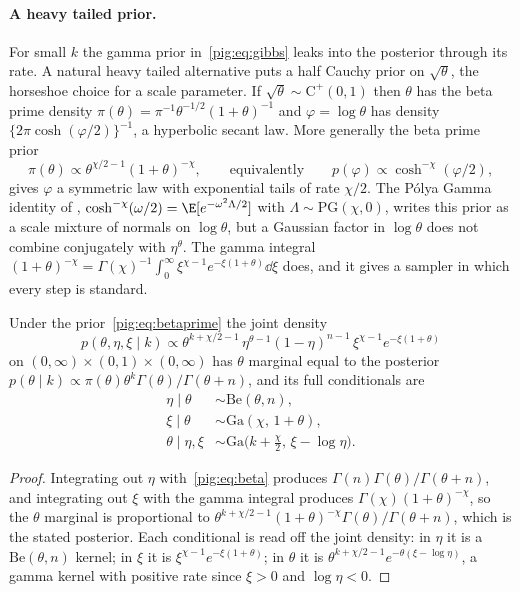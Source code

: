 \paragraph{A heavy tailed prior.} For small $k$ the gamma prior in~\eqref{pig:eq:gibbs} leaks into the posterior through its rate. A natural heavy tailed alternative puts a half Cauchy prior on $\sqrt\theta$, the horseshoe choice for a scale parameter. If $\sqrt\theta\sim\mathrm{C}^+(0,1)$ then $\theta$ has the beta prime density $\pi(\theta)=\pi^{-1}\theta^{-1/2}(1+\theta)^{-1}$ and $\varphi=\log\theta$ has density $\{2\pi\cosh(\varphi/2)\}^{-1}$, a hyperbolic secant law. More generally the beta prime prior
\begin{equation}\label{pig:eq:betaprime}
\pi(\theta)\propto\theta^{\chi/2-1}(1+\theta)^{-\chi},\qquad\text{equivalently}\qquad p(\varphi)\propto\cosh^{-\chi}(\varphi/2),
\end{equation}
gives $\varphi$ a symmetric law with exponential tails of rate $\chi/2$. The P\'olya Gamma identity of \citet{pig:polson2013}, $\cosh^{-\chi}(\omega/2)=\E[e^{-\omega^2\Lambda/2}]$ with $\Lambda\sim\mathrm{PG}(\chi,0)$, writes this prior as a scale mixture of normals on $\log\theta$, but a Gaussian factor in $\log\theta$ does not combine conjugately with $\eta^\theta$. The gamma integral $(1+\theta)^{-\chi}=\Gamma(\chi)^{-1}\int_0^\infty\xi^{\chi-1}e^{-\xi(1+\theta)}\dd\xi$ does, and it gives a sampler in which every step is standard.

\begin{proposition}\label{pig:prop:threeblock}
Under the prior~\eqref{pig:eq:betaprime} the joint density
\[
p(\theta,\eta,\xi\mid k)\propto\theta^{k+\chi/2-1}\,\eta^{\theta-1}(1-\eta)^{n-1}\,\xi^{\chi-1}e^{-\xi(1+\theta)}
\]
on $(0,\infty)\times(0,1)\times(0,\infty)$ has $\theta$ marginal equal to the posterior $p(\theta\mid k)\propto\pi(\theta)\theta^k\Gamma(\theta)/\Gamma(\theta+n)$, and its full conditionals are
\begin{align*}
\eta\mid\theta&\sim\mathrm{Be}(\theta,n),\\
\xi\mid\theta&\sim\mathrm{Ga}(\chi,\,1+\theta),\\
\theta\mid\eta,\xi&\sim\mathrm{Ga}\bigl(k+\tfrac{\chi}{2},\,\xi-\log\eta\bigr).
\end{align*}
\end{proposition}

\begin{proof}
Integrating out $\eta$ with~\eqref{pig:eq:beta} produces $\Gamma(n)\Gamma(\theta)/\Gamma(\theta+n)$, and integrating out $\xi$ with the gamma integral produces $\Gamma(\chi)(1+\theta)^{-\chi}$, so the $\theta$ marginal is proportional to $\theta^{k+\chi/2-1}(1+\theta)^{-\chi}\Gamma(\theta)/\Gamma(\theta+n)$, which is the stated posterior. Each conditional is read off the joint density: in $\eta$ it is a $\mathrm{Be}(\theta,n)$ kernel; in $\xi$ it is $\xi^{\chi-1}e^{-\xi(1+\theta)}$; in $\theta$ it is $\theta^{k+\chi/2-1}e^{-\theta(\xi-\log\eta)}$, a gamma kernel with positive rate since $\xi>0$ and $\log\eta<0$.
\end{proof}

